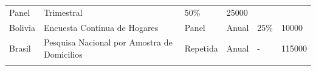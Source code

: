 \documentclass[12pt,spanish,]{book}
\begin{document}
\begin{longtable}[]{@{}llllll@{}}
\begin{minipage}[t]{0.06\columnwidth}
Panel\strut
\end{minipage} & \begin{minipage}[t]{0.08\columnwidth}\raggedright
Trimestral\strut
\end{minipage} & \begin{minipage}[t]{0.06\columnwidth}\raggedright
50\%\strut
\end{minipage} & \begin{minipage}[t]{0.13\columnwidth}\raggedright
25000\strut
\end{minipage}\tabularnewline
\begin{minipage}[t]{0.13\columnwidth}\raggedright
Bolivia\strut
\end{minipage} & \begin{minipage}[t]{0.38\columnwidth}\raggedright
Encuesta Continua de Hogares\strut
\end{minipage} & \begin{minipage}[t]{0.06\columnwidth}\raggedright
Panel\strut
\end{minipage} & \begin{minipage}[t]{0.08\columnwidth}\raggedright
Anual\strut
\end{minipage} & \begin{minipage}[t]{0.06\columnwidth}\raggedright
25\%\strut
\end{minipage} & \begin{minipage}[t]{0.13\columnwidth}\raggedright
10000\strut
\end{minipage}\tabularnewline
\begin{minipage}[t]{0.13\columnwidth}\raggedright
Brasil\strut
\end{minipage} & \begin{minipage}[t]{0.38\columnwidth}\raggedright
Pesquisa Nacional por Amostra de Domicilios\strut
\end{minipage} & \begin{minipage}[t]{0.06\columnwidth}\raggedright
Repetida\strut
\end{minipage} & \begin{minipage}[t]{0.08\columnwidth}\raggedright
Anual\strut
\end{minipage} & \begin{minipage}[t]{0.06\columnwidth}\raggedright
-\strut
\end{minipage} & \begin{minipage}[t]{0.13\columnwidth}\raggedright
115000\strut
\end{minipage}\tabularnewline
\begin{minipage}[t]{0.13\columnwidth}\raggedright

\end{minipage}
\end{longtable}
\end{document}
